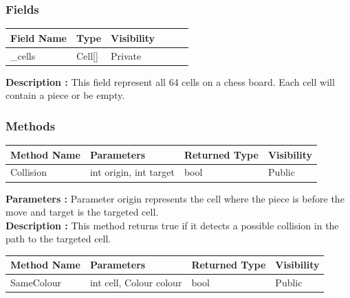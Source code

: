 \documentclass[12pt]{article}
\begin{document}
\subsubsection{Fields}

\begin{table}[H]
    \begin{tabular}{llllll}
    \hline
    \multicolumn{1}{|l|}{\cellcolor[HTML]{EFEFEF}\textbf{Field Name}} & \multicolumn{1}{l|}{\cellcolor[HTML]{EFEFEF}\textbf{Type}} & \multicolumn{1}{l|}{\cellcolor[HTML]{EFEFEF}\textbf{Visibility}} \\ \hline
    \multicolumn{1}{|l|}{\_cells}                                     & \multicolumn{1}{l|}{Cell[]}                                & \multicolumn{1}{l|}{Private}                                     \\ \hline
    \end{tabular}
\end{table}

\textbf{Description :} This field represent all 64 cells on a chess board. Each cell will contain a piece or be empty.

\subsubsection{Methods}

\begin{table}[H]
    \begin{tabular}{|l|l|l|l|}
    \hline
    \rowcolor[HTML]{EFEFEF} 
    \cellcolor[HTML]{EFEFEF}\textbf{Method Name} & \textbf{Parameters}    & \textbf{Returned Type} & \textbf{Visibility} \\ \hline
    Collision                                    & int origin, int target & bool                   & Public              \\ \hline
    \end{tabular}
\end{table}

\textbf{Parameters :} Parameter origin represents the cell
where the piece is before the move and target is the targeted
cell.
\\

\textbf{Description :} This method returns true if it detects a
possible collision in the path to the targeted cell.

\begin{table}[H]
    \begin{tabular}{|l|l|l|l|}
    \hline
    \rowcolor[HTML]{EFEFEF} 
    \cellcolor[HTML]{EFEFEF}\textbf{Method Name} & \textbf{Parameters}     & \textbf{Returned Type} & \textbf{Visibility} \\ \hline
    SameColour                                   & int cell, Colour colour & bool                   & Public              \\ \hline
    \end{tabular}
\end{table}
\end{document}
